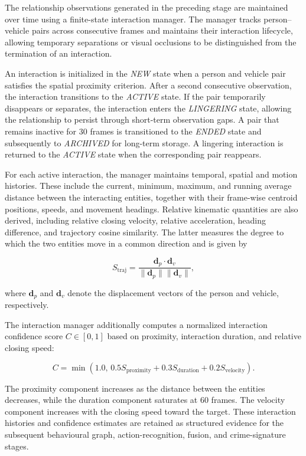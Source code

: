 \documentclass[conference]{IEEEtran}
\begin{document}
The relationship observations generated in the preceding stage are
maintained over time using a finite-state interaction manager. The
manager tracks person--vehicle pairs across consecutive frames and
maintains their interaction lifecycle, allowing temporary separations
or visual occlusions to be distinguished from the termination of an
interaction.

An interaction is initialized in the \textit{NEW} state when a person
and vehicle pair satisfies the spatial proximity criterion. After a
second consecutive observation, the interaction transitions to the
\textit{ACTIVE} state. If the pair temporarily disappears or separates,
the interaction enters the \textit{LINGERING} state, allowing the
relationship to persist through short-term observation gaps. A pair
that remains inactive for 30 frames is transitioned to the
\textit{ENDED} state and subsequently to \textit{ARCHIVED} for
long-term storage. A lingering interaction is returned to the
\textit{ACTIVE} state when the corresponding pair reappears.

For each active interaction, the manager maintains temporal, spatial and
motion histories. These include the current, minimum, maximum, and
running average distance between the interacting entities, together
with their frame-wise centroid positions, speeds, and movement
headings. Relative kinematic quantities are also derived, including
relative closing velocity, relative acceleration, heading difference,
and trajectory cosine similarity. The latter measures the degree to
which the two entities move in a common direction and is given by

\begin{equation}
S_{\mathrm{traj}} =
\frac{\mathbf{d}_{p}\cdot\mathbf{d}_{v}}
{\|\mathbf{d}_{p}\|\|\mathbf{d}_{v}\|},
\end{equation}

where $\mathbf{d}_{p}$ and $\mathbf{d}_{v}$ denote the displacement
vectors of the person and vehicle, respectively.

The interaction manager additionally computes a normalized interaction
confidence score $C\in[0,1]$ based on proximity, interaction duration,
and relative closing speed:

\begin{equation}
C =
\min\left(1.0,\,
0.5S_{\mathrm{proximity}}
+0.3S_{\mathrm{duration}}
+0.2S_{\mathrm{velocity}}\right).
\end{equation}

The proximity component increases as the distance between the entities
decreases, while the duration component saturates at 60 frames.
The velocity component increases with the closing speed toward the
target. These interaction histories and confidence estimates are
retained as structured evidence for the subsequent behavioural graph,
action-recognition, fusion, and crime-signature stages.
\end{document}
